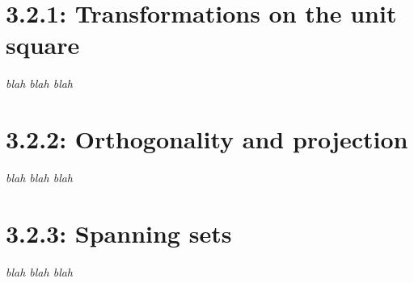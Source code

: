 \documentclass{article}
\begin{document}
\section*{3.2.1: Transformations on the unit square}
\textit{blah blah blah} 
\pagebreak 

\section*{3.2.2: Orthogonality and projection}
\textit{blah blah blah} 
\pagebreak 

\section*{3.2.3: Spanning sets}
\textit{blah blah blah}
\end{document}
